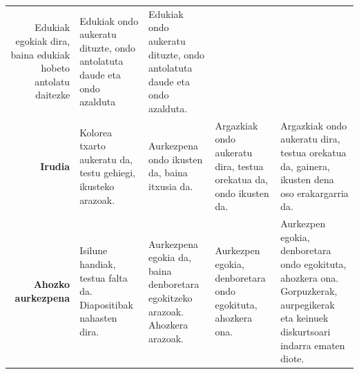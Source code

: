 \documentclass[
]{book}
\begin{document}
\begin{longtable}[]{@{}rllll@{}}
\begin{minipage}[t]{0.19\columnwidth}
Edukiak egokiak dira, baina edukiak hobeto antolatu daitezke\strut
\end{minipage} & \begin{minipage}[t]{0.19\columnwidth}\raggedright
Edukiak ondo aukeratu dituzte, ondo antolatuta daude eta ondo azalduta\strut
\end{minipage} & \begin{minipage}[t]{0.19\columnwidth}\raggedright
Edukiak ondo aukeratu dituzte, ondo antolatuta daude eta ondo azalduta.\strut
\end{minipage}\tabularnewline
\begin{minipage}[t]{0.11\columnwidth}\raggedleft
\textbf{Irudia}\strut
\end{minipage} & \begin{minipage}[t]{0.19\columnwidth}\raggedright
Kolorea txarto aukeratu da, testu gehiegi, ikusteko arazoak.\strut
\end{minipage} & \begin{minipage}[t]{0.19\columnwidth}\raggedright
Aurkezpena ondo ikusten da, baina itxusia da.\strut
\end{minipage} & \begin{minipage}[t]{0.19\columnwidth}\raggedright
Argazkiak ondo aukeratu dira, testua orekatua da, ondo ikusten da.\strut
\end{minipage} & \begin{minipage}[t]{0.19\columnwidth}\raggedright
Argazkiak ondo aukeratu dira, testua orekatua da, gainera, ikusten dena oso erakargarria da.\strut
\end{minipage}\tabularnewline
\begin{minipage}[t]{0.11\columnwidth}\raggedleft
\textbf{Ahozko aurkezpena}\strut
\end{minipage} & \begin{minipage}[t]{0.19\columnwidth}\raggedright
Isilune handiak, testua falta da. Diapositibak nahasten dira.\strut
\end{minipage} & \begin{minipage}[t]{0.19\columnwidth}\raggedright
Aurkezpena egokia da, baina denboretara egokitzeko arazoak. Ahozkera arazoak.\strut
\end{minipage} & \begin{minipage}[t]{0.19\columnwidth}\raggedright
Aurkezpen egokia, denboretara ondo egokituta, ahozkera ona.\strut
\end{minipage} & \begin{minipage}[t]{0.19\columnwidth}\raggedright
Aurkezpen egokia, denboretara ondo egokituta, ahozkera ona. Gorpuzkerak, aurpegikerak eta keinuek diskurtsoari indarra ematen diote.\textbar{}\strut
\end{minipage}\tabularnewline
\bottomrule
\end{longtable}
\end{document}
